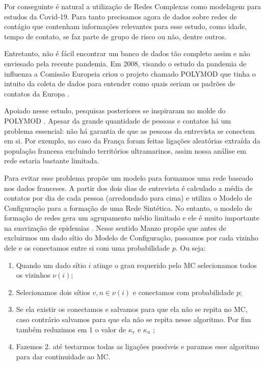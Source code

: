 \documentclass[12pt]{abnt-fisica11}%
\begin{document}
Por conseguinte é natural a utilização de Redes Complexas como modelagem para estudos da Covid-19. Para tanto precisamos agora de dados sobre redes de contágio que contenham informações relevantes para esse estudo, como idade, tempo de contato, se faz parte de grupo de risco ou não, dentre outros.

Entretanto, não é fácil encontrar um banco de dados tão completo assim e não enviesado pela recente pandemia. Em 2008, visando o estudo da pandemia de influenza a Comissão Europeia criou o projeto chamado POLYMOD \cite{POLYMOD} que tinha o intuito da coleta de dados para entender como quais seriam os padrões de contatos da Europa \cite{Mossong2008}.

Apoiado nesse estudo, pesquisas posteriores se inspiraram no molde do POLYMOD \cite{Belga2009,Belga2010,China,France,HongKong,Peru,Russia,Thailand,Vietnam,Zambia,Zimbabwe}. Apesar da grande quantidade de pessoas e contatos há um problema essencial: não há garantia de que as pessoas da entrevista se conectem em si. Por exemplo, no caso da França \cite{France} foram feitas ligações aleatórias extraída da população francesa excluindo territórios ultramarinos, assim nossa análise em rede estaria bastante limitada.

Para evitar esse problema \cite{Manzo2020} propõe um modelo para formamos uma rede baseado nos dados franceses. A partir dos dois dias de entrevista é calculado a média de contatos por dia de cada pessoa (arredondado para cima) e utiliza o Modelo de Configuração para a formação de uma Rede Sintética. No entanto, o modelo de formação de redes gera um agrupamento médio limitado e ele é muito importante na suavização de epidemias \cite{Block2020}. Nesse sentido Manzo propõe que antes de excluirmos um dado sítio do Modelo de Configuração, passamos por cada vizinho dele e os conectamos entre si com uma probabilidade $p$. Ou seja:

\begin{enumerate}
  \item Quando um dado sítio $i$ atinge o grau requerido pelo MC selecionamos todos os vizinhos $\nu(i)$;
  \item Selecionamos dois sítios $v,n \in \nu(i)$ e conectamos com probabilidade $p$;
  \item Se ela existir os conectamos e salvamos para que ela não se repita no MC, caso contrário salvamos para que ela não se repita nesse algoritmo. Por fim também reduzimos em 1 o valor de $\kappa_v$ e $\kappa_n$ ;
  \item Fazemos 2. até testarmos todas as ligações possíveis e paramos esse algoritmo para dar continuidade ao MC.
\end{enumerate}
\end{document}
